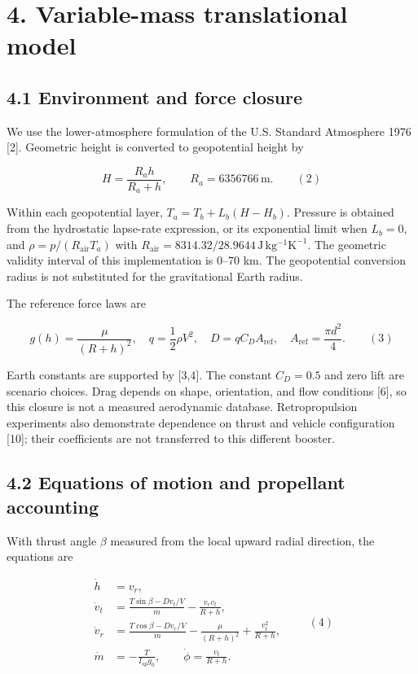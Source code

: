 \documentclass[
  11pt,
  a4paper,
]{article}
\begin{document}
\section{4. Variable-mass translational
model}\label{variable-mass-translational-model}

\subsection{4.1 Environment and force
closure}\label{environment-and-force-closure}

We use the lower-atmosphere formulation of the U.S. Standard Atmosphere
1976 {[}2{]}. Geometric height is converted to geopotential height by

\[ H=\frac{R_a h}{R_a+h},\qquad R_a=6356766\,\mathrm{m}. \qquad (2) \]

Within each geopotential layer, \(T_a=T_b+L_b(H-H_b)\). Pressure is
obtained from the hydrostatic lapse-rate expression, or its exponential
limit when \(L_b=0\), and \(\rho=p/(R_{\mathrm{air}}T_a)\) with
\(R_{\mathrm{air}}=8314.32/28.9644\,\mathrm{J\,kg^{-1}K^{-1}}\). The
geometric validity interval of this implementation is 0--70 km. The
geopotential conversion radius is not substituted for the gravitational
Earth radius.

The reference force laws are

\[ g(h)=\frac{\mu}{(R+h)^2},\quad q=\frac12\rho V^2,\quad D=qC_DA_{\mathrm{ref}},\quad A_{\mathrm{ref}}=\frac{\pi d^2}{4}. \qquad (3) \]

Earth constants are supported by {[}3,4{]}. The constant \(C_D=0.5\) and
zero lift are scenario choices. Drag depends on shape, orientation, and
flow conditions {[}6{]}, so this closure is not a measured aerodynamic
database. Retropropulsion experiments also demonstrate dependence on
thrust and vehicle configuration {[}10{]}; their coefficients are not
transferred to this different booster.

\subsection{4.2 Equations of motion and propellant
accounting}\label{equations-of-motion-and-propellant-accounting}

With thrust angle \(\beta\) measured from the local upward radial
direction, the equations are

\[
\begin{aligned}
\dot h &= v_r,\\
\dot v_t &= \frac{T\sin\beta-Dv_t/V}{m}-\frac{v_rv_t}{R+h},\\
\dot v_r &= \frac{T\cos\beta-Dv_r/V}{m}-\frac{\mu}{(R+h)^2}+\frac{v_t^2}{R+h},\\
\dot m &= -\frac{T}{I_{sp}g_0},\qquad \dot\phi=\frac{v_t}{R+h}.
\end{aligned}\qquad (4)
\]
\end{document}
